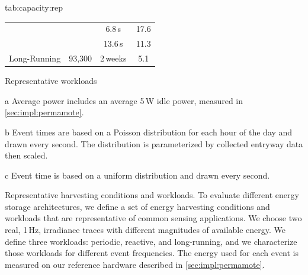\begin{definetable}{tab:capacity:rep}
\begin{threeparttable}
\begin{subtable}{\columnwidth}
\begin{tabular}{r | c | c | c}
                                        &                       & 6.8\,s\,\tnote{b}     &  17.6     \\
                                        &                       & 13.6\,s\,\tnote{b}    &  11.3     \\\hline
                 Long-Running           & 93,300                 & 2\,weeks\,\tnote{c}  &  5.1      \\
            \end{tabular}
            \caption{Representative workloads}
        \end{subtable}
    \end{threeparttable}
    \vspace{-4pt}
    \begin{tablenotes}[para]
    \scriptsize
    \item[a] Average power includes an average 5\,\textmu W idle power, measured in \cref{sec:impl:permamote}.\\
    \item[b] Event times are based on a Poisson distribution for each hour of the day and drawn every second. The distribution is parameterized by collected entryway data then scaled.\\
    \item[c] Event time is based on a uniform distribution and drawn every second.
    \end{tablenotes}
    \caption{\normalfont Representative harvesting conditions and workloads.
    To evaluate different energy storage architectures, we define a set of energy harvesting
    conditions and workloads that are representative of common sensing applications. We choose two
    real, 1\,Hz, irradiance traces with different magnitudes of available energy. We define three
    workloads: periodic, reactive, and long-running, and we characterize those workloads
    for different event frequencies. The energy used for each event is measured
    on our reference hardware described in \cref{sec:impl:permamote}.
    }
\end{definetable}

